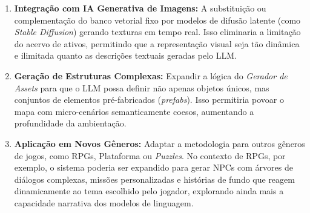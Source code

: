 \begin{enumerate}
    \item \textbf{Integração com IA Generativa de Imagens:} A substituição ou
    complementação do banco vetorial fixo por modelos de difusão latente (como
    \textit{Stable Diffusion}) gerando texturas em tempo real. Isso eliminaria a
    limitação do acervo de ativos, permitindo que a representação visual seja
    tão dinâmica e ilimitada quanto as descrições textuais geradas pelo
    \gls{LLM}.

    \item \textbf{Geração de Estruturas Complexas:} Expandir a lógica do
    \textit{Gerador de Assets} para que o \gls{LLM} possa definir não apenas
    objetos únicos, mas conjuntos de elementos pré-fabricados
    (\textit{prefabs}). Isso permitiria povoar o mapa com micro-cenários
    semanticamente coesos, aumentando a profundidade da ambientação.

    \item \textbf{Aplicação em Novos Gêneros:} Adaptar a metodologia para outros
    gêneros de jogos, como RPGs, Plataforma ou \textit{Puzzles}. No contexto de
    \gls{RPG}s, por exemplo, o sistema poderia ser expandido para gerar
    \gls{NPC}s com árvores de diálogos complexas, missões personalizadas e
    histórias de fundo que reagem dinamicamente ao tema escolhido pelo jogador,
    explorando ainda mais a capacidade narrativa dos modelos de linguagem.
\end{enumerate}